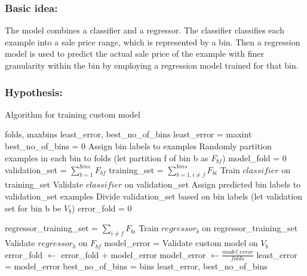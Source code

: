 \documentclass[conference,compsoc]{IEEEtran}
\begin{document}
\subsubsection{Basic idea:} 
\par
The model combines a classifier and a regressor. The classifier classifies each example into a sale price range, which is represented by a bin. Then a regression model is used to predict the actual sale price of the example with finer granularity within the bin by employing a regression model trained for that bin.

\subsubsection{Hypothesis:} 

\begin{algorithm}
\caption{Algorithm for training custom model}
\begin{algorithmic}[1]
\renewcommand{\algorithmicrequire}{\textbf{Input:}}
\renewcommand{\algorithmicensure}{\textbf{Output:}}
\REQUIRE folds, maxbins
\ENSURE  least\_error, best\_no\_of\_bins
\STATE least\_error = maxint
\STATE best\_no\_of\_bins = 0
  \STATE Assign bin labels to examples
  \STATE Randomly partition examples in each bin to folds (let partition f of bin b as $F_{bf}$)
  \STATE model\_fold = 0
      \STATE validation\_set = $\sum_{b=1}^{bins} F_{bf}$
      \STATE training\_set = $\sum_{b=1, i\neq f}^{bins} F_{bi}$
      \STATE Train $classifier$ on training\_set
      \STATE Validate $classifier$ on validation\_set
      \STATE Assign predicted bin labels to validation\_set examples
      \STATE Divide validation\_set based on bin labels (let validation set for bin b be $V_{b}$)
      \STATE error\_fold = 0

          \STATE regressor\_training\_set = $\sum_{i\neq f} F_{bi}$
          \STATE Train $regressor_{b}$ on regressor\_training\_set
          \STATE Validate $regressor_{b}$ on $F_{bf}$
          \STATE model\_error = Validate custom model on $V_{b}$
          \STATE error\_fold $\leftarrow$ error\_fold + model\_error
      \ENDFOR
  \ENDFOR
  \STATE model\_error $\leftarrow \frac{model\_error}{folds}$
      \STATE least\_error = model\_error
      \STATE best\_no\_of\_bins = bins
  \ELSE
      \RETURN least\_error, best\_no\_of\_bins
  \ENDIF
\ENDFOR
\end{algorithmic} 
\end{algorithm}
\end{document}
